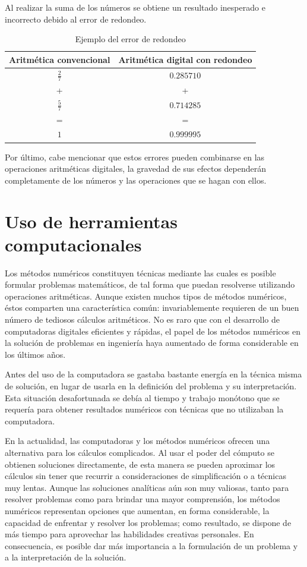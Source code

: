 Al realizar la suma de los números se obtiene un resultado inesperado e incorrecto debido al error de redondeo.

\begin{table}[H]
	\centering
	\begin{tabular}{cc}
		\toprule
		\textbf{Aritmética convencional} & \textbf{Aritmética digital con redondeo}\\
		\midrule
		$\frac{2}{7}$ & $0.285710$\\
		+ & + \\
		$\frac{5}{7}$ & $0.714285$\\
		= & = \\
		$1$ & $0.999995$		
	\end{tabular}
	\caption{Ejemplo del error de redondeo}
	\label{table:errorTruncamiento}
\end{table}

Por último, cabe mencionar que estos errores pueden combinarse en las operaciones aritméticas digitales, la gravedad de sus efectos dependerán completamente 
de los números y las operaciones que se hagan con ellos.

\section{Uso de herramientas computacionales}
Los métodos numéricos constituyen técnicas mediante las cuales es posible formular problemas matemáticos, de tal forma que puedan resolverse
utilizando operaciones aritméticas. Aunque existen muchos tipos de métodos numéricos, éstos comparten una característica común: invariablemente
requieren de un buen número de tediosos cálculos aritméticos. No es raro que con el desarrollo de computadoras digitales eficientes y rápidas, 
el papel de los métodos numéricos en la solución de problemas en ingeniería haya aumentado de forma considerable en los últimos años.

Antes del uso de la computadora se gastaba bastante energía en la técnica misma de solución, en lugar de usarla en la definición del problema
y su interpretación. Esta situación desafortunada se debía al tiempo y trabajo monótono que se requería para obtener resultados numéricos con
técnicas que no utilizaban la computadora. 

En la actualidad, las computadoras y los métodos numéricos ofrecen una alternativa para los cálculos complicados. Al usar el poder del cómputo
se obtienen soluciones directamente, de esta manera se pueden aproximar los cálculos sin tener que recurrir a consideraciones de simplificación
o a técnicas muy lentas. Aunque las soluciones analíticas aún son muy valiosas, tanto para resolver problemas como para brindar una mayor
comprensión, los métodos numéricos representan opciones que aumentan, en forma considerable, la capacidad de enfrentar y resolver los problemas;
como resultado, se dispone de más tiempo para aprovechar las habilidades creativas personales. En consecuencia, es posible dar más importancia
a la formulación de un problema y a la interpretación de la solución.

